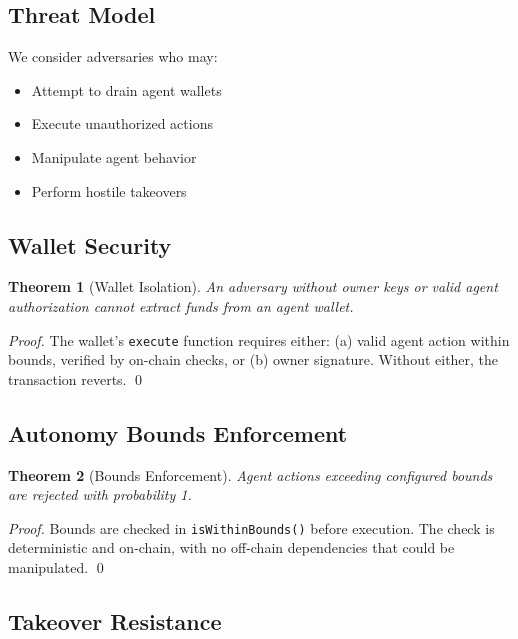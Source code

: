 \documentclass[11pt,letterpaper]{article}
\newtheorem{theorem}{Theorem}[section]
\begin{document}
\subsection{Threat Model}

We consider adversaries who may:
\begin{itemize}
    \item Attempt to drain agent wallets
    \item Execute unauthorized actions
    \item Manipulate agent behavior
    \item Perform hostile takeovers
\end{itemize}

\subsection{Wallet Security}

\begin{theorem}[Wallet Isolation]
An adversary without owner keys or valid agent authorization cannot extract funds from an agent wallet.
\end{theorem}

\begin{proof}
The wallet's \texttt{execute} function requires either:
(a) valid agent action within bounds, verified by on-chain checks, or
(b) owner signature.
Without either, the transaction reverts. \qed
\end{proof}

\subsection{Autonomy Bounds Enforcement}

\begin{theorem}[Bounds Enforcement]
Agent actions exceeding configured bounds are rejected with probability 1.
\end{theorem}

\begin{proof}
Bounds are checked in \texttt{isWithinBounds()} before execution. The check is deterministic and on-chain, with no off-chain dependencies that could be manipulated. \qed
\end{proof}

\subsection{Takeover Resistance}
\end{document}
